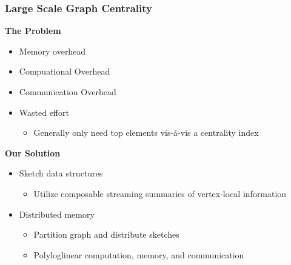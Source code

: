 \documentclass{beamer}
\begin{document}

 \begin{frame}
\frametitle{Large Scale Graph Centrality}

\textbf{The Problem}
\begin{itemize}
	\item Memory overhead
	\item Compuational Overhead
	\item Communication Overhead
	\item Wasted effort 
	\begin{itemize}
		\item Generally only need top elements vis-\'a-vis a centrality index
	\end{itemize}
\end{itemize}
\textbf{Our Solution}
\begin{itemize}
	\item Sketch data structures
	\begin{itemize}
		\item Utilize composable streaming summaries of vertex-local information
	\end{itemize}
	\item Distributed memory
	\begin{itemize}
		\item Partition graph and distribute sketches
		\item Polyloglinear computation, memory, and communication
	\end{itemize}
\end{itemize}

\end{frame}
\end{document}
